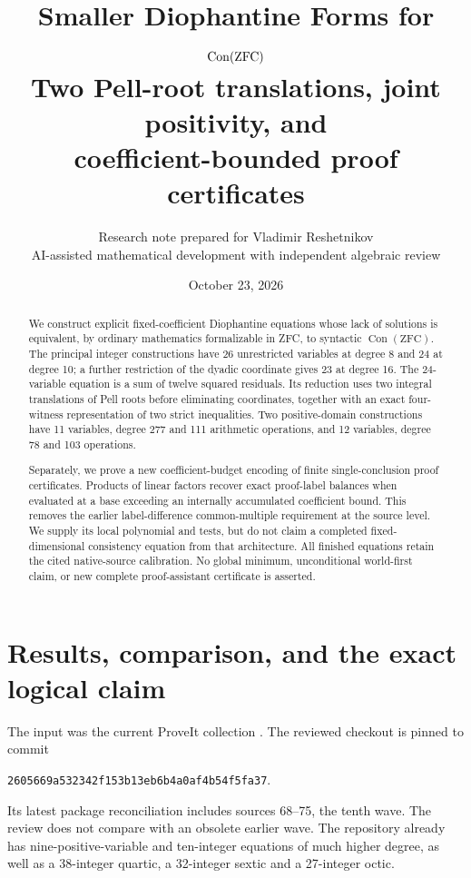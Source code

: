 \documentclass[11pt,letterpaper]{article}
\title{Smaller Diophantine Forms for $\Con(\ZFC)$\\[5pt]
\large Two Pell-root translations, joint positivity, and\\coefficient-bounded proof certificates}
\author{Research note prepared for Vladimir Reshetnikov\\
\small AI-assisted mathematical development with independent algebraic review}
\date{October 23, 2026}
\newcommand{\Con}{\operatorname{Con}}
\newcommand{\ZFC}{\mathrm{ZFC}}
\theoremstyle{definition}
\theoremstyle{remark}
\begin{document}
\maketitle
\begin{abstract}
We construct explicit fixed-coefficient Diophantine equations whose lack of
solutions is equivalent, by ordinary mathematics formalizable in ZFC, to
syntactic $\Con(\ZFC)$. The principal integer constructions have 26 unrestricted
variables at degree 8 and 24 at degree 10; a further restriction of the
dyadic coordinate gives 23 at degree 16. The 24-variable equation is a sum
of twelve squared residuals. Its reduction uses two integral translations
of Pell roots before eliminating coordinates, together with an exact
four-witness representation of two strict inequalities. Two positive-domain
constructions have 11 variables, degree 277 and 111 arithmetic operations,
and 12 variables, degree 78 and 103 operations.

Separately, we prove a new coefficient-budget encoding of finite
single-conclusion proof certificates. Products of linear factors recover
exact proof-label balances when evaluated at a base exceeding an internally
accumulated coefficient bound. This removes the earlier label-difference
common-multiple requirement at the source level. We supply its local
polynomial and tests, but do not claim a completed fixed-dimensional
consistency equation from that architecture. All finished equations retain
the cited native-source calibration. No global minimum, unconditional
world-first claim, or new complete proof-assistant certificate is asserted.
\end{abstract}

\tableofcontents

\section{Results, comparison, and the exact logical claim}
\label{sec:scope}

The input was the current ProveIt collection
.
The reviewed checkout is pinned to commit
\begin{center}
\texttt{2605669a532342f153b13eb6b4a0af4b54f5fa37}.
\end{center}
Its latest package reconciliation includes sources 68--75, the tenth wave. The review does
not compare with an obsolete earlier wave. The repository already has
nine-positive-variable and ten-integer equations of much higher degree,
as well as a 38-integer quartic, a 32-integer sextic and a 27-integer
octic\cite{frontier,source68,source69,source70,source71}.
\end{document}
